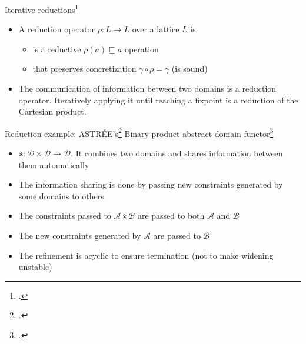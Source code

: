 \documentclass[aspectratio=169]{beamer}
\begin{document}
\begin{frame}{Iterative reductions\footcite{cousot2011reduced}}
  \small
  \begin{tightcenter}
  \end{tightcenter}
  \begin{itemize}
  \item A reduction operator $\rho: L \to L$ over a lattice $L$ is
    \begin{itemize}
    \item<2-> is a reductive $\rho(a) \sqsubseteq a$ operation
    \item<3-> that preserves concretization $\gamma \circ \rho = \gamma$ (is sound)
    \end{itemize}
  \item<4-> The communication of information between two domains is a reduction operator. Iteratively applying it until reaching a fixpoint is a reduction of the Cartesian product.
  \end{itemize}
\end{frame}

\begin{frame}{Reduction example: ASTRÉE's\footcite{cousot2005astree} Binary product abstract domain functor\footcite{cousot2006combination}}
  \begin{itemize}[<+->]
  \item $\dottimes : \mathcal{D \times D} \to \mathcal{D}$. It combines two domains and shares information between them automatically
  \item The information sharing is done by passing new constraints generated by some domains to others
  \item The constraints passed to $\mathcal{A \dottimes B}$ are passed to both $\mathcal{A}$ and $\mathcal{B}$
  \item The new constraints generated by $\mathcal{A}$ are passed to $\mathcal{B}$
  \item The refinement is acyclic to ensure termination (not to make widening unstable)
  \end{itemize}
\end{frame}
\end{document}
